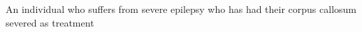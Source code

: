 An individual who suffers from severe epilepsy who has had their corpus callosum severed as treatment
